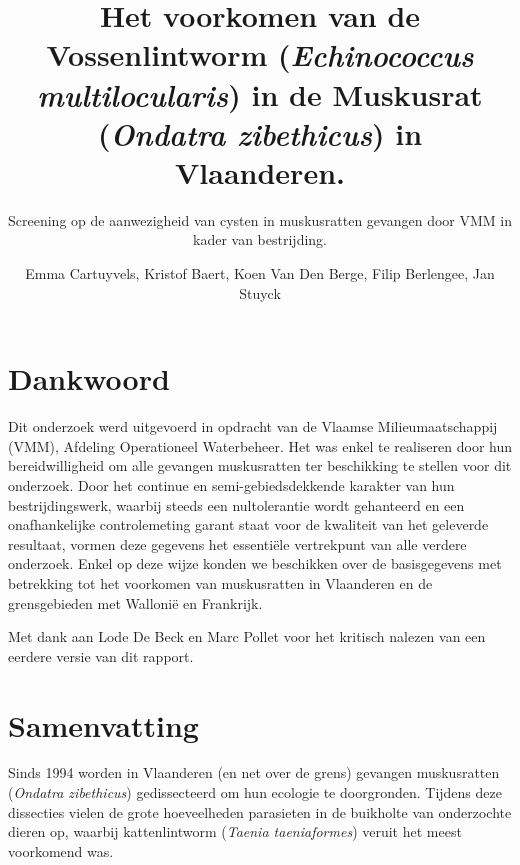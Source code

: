 \documentclass[twoside]{extreport}
\title{Het voorkomen van de Vossenlintworm (\emph{Echinococcus multilocularis})
in de Muskusrat (\emph{Ondatra zibethicus}) in Vlaanderen.}
\subtitle{Screening op de aanwezigheid van cysten in muskusratten gevangen door
VMM in kader van bestrijding.}
\author{Emma Cartuyvels, Kristof Baert, Koen Van Den Berge, Filip Berlengee, Jan Stuyck}
\begin{document}
\maketitle
{}



\clearpage

\setcounter{tocdepth}{3}
\tableofcontents
{}

\clearpage

\listoffigures
{}
\vspace{34pt}

\listoftables
{}

\clearpage


\chapter*{Dankwoord}\label{dankwoord}

Dit onderzoek werd uitgevoerd in opdracht van de Vlaamse
Milieumaatschappij (VMM), Afdeling Operationeel Waterbeheer. Het was
enkel te realiseren door hun bereidwilligheid om alle gevangen
muskusratten ter beschikking te stellen voor dit onderzoek. Door het
continue en semi-gebiedsdekkende karakter van hun bestrijdingswerk,
waarbij steeds een nultolerantie wordt gehanteerd en een onafhankelijke
controlemeting garant staat voor de kwaliteit van het geleverde
resultaat, vormen deze gegevens het essentiële vertrekpunt van alle
verdere onderzoek. Enkel op deze wijze konden we beschikken over de
basisgegevens met betrekking tot het voorkomen van muskusratten in
Vlaanderen en de grensgebieden met Wallonië en Frankrijk.

Met dank aan Lode De Beck en Marc Pollet voor het kritisch nalezen van
een eerdere versie van dit rapport.

\chapter*{Samenvatting}\label{samenvatting}

Sinds 1994 worden in Vlaanderen (en net over de grens) gevangen
muskusratten (\emph{Ondatra zibethicus}) gedissecteerd om hun ecologie
te doorgronden. Tijdens deze dissecties vielen de grote hoeveelheden
parasieten in de buikholte van onderzochte dieren op, waarbij
kattenlintworm (\emph{Taenia taeniaformes}) veruit het meest voorkomend
was.
\end{document}
